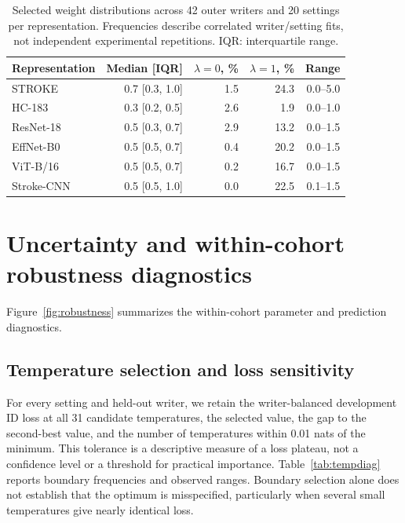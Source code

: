 \documentclass[10pt,a4paper]{article}
\begin{document}
\begin{table}[ht]
\centering\small
\caption{Selected weight distributions across 42 outer writers and 20 settings per representation. Frequencies describe correlated writer/setting fits, not independent experimental repetitions. IQR: interquartile range.}
\begin{tabular}{lrrrr}\toprule
Representation & Median [IQR] & $\lambda=0$, \% & $\lambda=1$, \% & Range\\\midrule
STROKE & 0.7 [0.3, 1.0] & 1.5 & 24.3 & 0.0--5.0 \\
HC-183 & 0.3 [0.2, 0.5] & 2.6 & 1.9 & 0.0--1.0 \\
ResNet-18 & 0.5 [0.3, 0.7] & 2.9 & 13.2 & 0.0--1.5 \\
EffNet-B0 & 0.5 [0.5, 0.7] & 0.4 & 20.2 & 0.0--1.5 \\
ViT-B/16 & 0.5 [0.5, 0.7] & 0.2 & 16.7 & 0.0--1.5 \\
Stroke-CNN & 0.5 [0.5, 1.0] & 0.0 & 22.5 & 0.1--1.5 \\
\bottomrule

\end{tabular}
\end{table}

\section{Uncertainty and within-cohort robustness diagnostics}
\label{sec:suprobust}
Figure~\ref{fig:robustness} summarizes the within-cohort parameter and prediction diagnostics.
\subsection{Temperature selection and loss sensitivity}
For every setting and held-out writer, we retain the writer-balanced development ID loss at all 31 candidate temperatures, the selected value, the gap to the second-best value, and the number of temperatures within 0.01 nats of the minimum. This tolerance is a descriptive measure of a loss plateau, not a confidence level or a threshold for practical importance. Table~\ref{tab:tempdiag} reports boundary frequencies and observed ranges. Boundary selection alone does not establish that the optimum is misspecified, particularly when several small temperatures give nearly identical loss.
\end{document}
